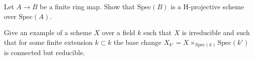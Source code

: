 \begin{exercise}
\label{exercise-finite-is-projective}
Let $A \to B$ be a finite ring map. Show that
$\text{Spec}(B)$ is a H-projective scheme over $\text{Spec}(A)$.
\end{exercise}

\begin{exercise}
\label{exercise-not-geometrcally-irreducible}
Give an example of a scheme $X$ over a field $k$ such that
$X$ is irreducible and such that for some finite extension $k \subset k$
the base change $X_{k'} = X \times_{\text{Spec}(k)} \text{Spec}(k')$
is connected but reducible.
\end{exercise}
















